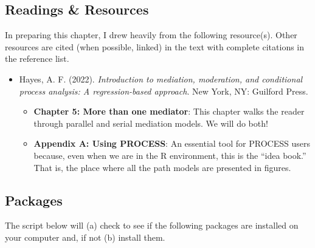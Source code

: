 \documentclass[
  11pt,
]{book}
\providecommand{\tightlist}{%
  \setlength{\itemsep}{0pt}\setlength{\parskip}{0pt}}
\begin{document}
\hypertarget{readings-resources-5}{%
\subsection{Readings \& Resources}\label{readings-resources-5}}

In preparing this chapter, I drew heavily from the following resource(s). Other resources are cited (when possible, linked) in the text with complete citations in the reference list.

\begin{itemize}
\tightlist
\item
  Hayes, A. F. (2022). \emph{Introduction to mediation, moderation, and conditional process analysis: A regression-based approach}. New York, NY: Guilford Press.

  \begin{itemize}
  \tightlist
  \item
    \textbf{Chapter 5: More than one mediator}: This chapter walks the reader through parallel and serial mediation models. We will do both!
  \item
    \textbf{Appendix A: Using PROCESS}: An essential tool for PROCESS users because, even when we are in the R environment, this is the ``idea book.'' That is, the place where all the path models are presented in figures.
  \end{itemize}
\end{itemize}

\hypertarget{packages-5}{%
\subsection{Packages}\label{packages-5}}

The script below will (a) check to see if the following packages are installed on your computer and, if not (b) install them.
\end{document}
